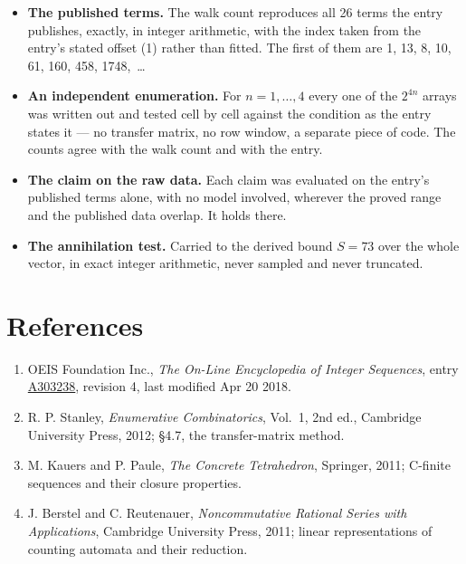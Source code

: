 \documentclass[11pt]{article}
\theoremstyle{definition}
\begin{document}
\begin{itemize}

\item {\bfseries The published terms.} The walk count reproduces all 26 terms the entry publishes, exactly, in integer arithmetic, with the index taken from the entry's stated offset (1) rather than fitted. The first of them are 1, 13, 8, 10, 61, 160, 458, 1748,~\dots

\item {\bfseries An independent enumeration.} For $n = 1,\dots,4$ every one of the $2^{4n}$ arrays was written out and tested cell by cell against the condition as the entry states it --- no transfer matrix, no row window, a separate piece of code. The counts agree with the walk count and with the entry.

\item {\bfseries The claim on the raw data.} Each claim was evaluated on the entry's published terms alone, with no model involved, wherever the proved range and the published data overlap. It holds there.

\item {\bfseries The annihilation test.} Carried to the derived bound $S = 73$ over the whole vector, in exact integer arithmetic, never sampled and never truncated.

\end{itemize}

\section{References}

\begin{enumerate}

\item OEIS Foundation Inc., \emph{The On-Line Encyclopedia of Integer Sequences}, entry \href{https://oeis.org/A303238}{A303238}, revision 4, last modified Apr 20 2018.

\item R. P. Stanley, \emph{Enumerative Combinatorics}, Vol.~1, 2nd ed., Cambridge University Press, 2012; \S4.7, the transfer-matrix method.

\item M. Kauers and P. Paule, \emph{The Concrete Tetrahedron}, Springer, 2011; C-finite sequences and their closure properties.

\item J. Berstel and C. Reutenauer, \emph{Noncommutative Rational Series with Applications}, Cambridge University Press, 2011; linear representations of counting automata and their reduction.

\end{enumerate}
\end{document}
